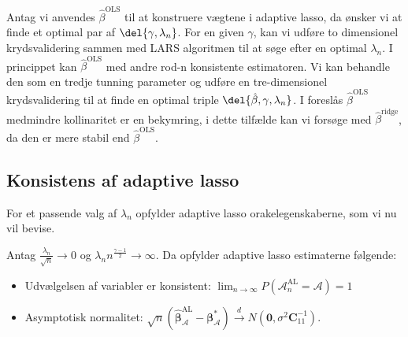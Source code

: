 Antag vi anvendes \(\hat{\beta}^\text{OLS}\) til at konstruere vægtene i adaptive lasso, da ønsker vi at finde et optimal par af \(\del{\gamma, \lambda_n}\).
For en given \(\gamma\), kan vi udføre to dimensionel krydsvalidering sammen med LARS algoritmen til at søge efter en optimal \(\lambda_n\).
I princippet kan \(\hat{\beta}^\text{OLS}\) med andre rod-n konsistente estimatoren.
Vi kan behandle den som en tredje tunning parameter og udføre en tre-dimensionel krydsvalidering til at finde en optimal triple \(\del{\hat{\beta}, \gamma, \lambda_n}\).
I \citep{adaptive_lasso} foreslås \(\hat{\beta}^\text{OLS}\) medmindre kollinaritet er en bekymring, i dette tilfælde kan vi forsøge med \(\hat{\beta}^\text{ridge}\), da den er mere stabil end \(\hat{\beta}^\text{OLS}\).
%
\subsection{Konsistens af adaptive lasso} \label{subsec:konsistentAL}
For et passende valg af \(\lambda_n\) opfylder adaptive lasso orakelegenskaberne, som vi nu vil bevise.
\begin{thm}\label{thm:ALoracle}
Antag $\frac{\lambda_n}{\sqrt{n}} \rightarrow 0$ og $\lambda_n n^\frac{\gamma-1}{2} \rightarrow \infty$. Da opfylder adaptive lasso estimaterne følgende:
\begin{itemize}
\item Udvælgelsen af variabler er konsistent: $\lim_{n \rightarrow \infty} P(\mathcal{A}_n^\text{AL}=\mathcal{A})=1$
\item Asymptotisk normalitet: $\sqrt{n}\left( \hat{\boldsymbol{\beta}}_\mathcal{A}^{\text{AL}}-\boldsymbol{\beta}_\mathcal{A}^* \right) \overset{d}{\rightarrow} N(\textbf{0},\sigma^2 \boldsymbol{C}_{11}^{-1}).$
\end{itemize} 
\end{thm}
